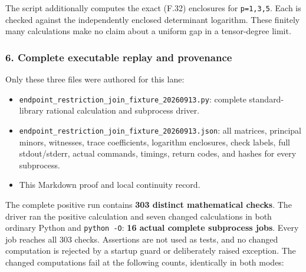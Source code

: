The script additionally computes the exact (F.32) enclosures for \nolinkurl{p=1,3,5}. Each is checked against the independently enclosed determinant logarithm. These finitely many calculations make no claim about a uniform gap in a tensor-degree limit.

\subsubsection{6. Complete executable replay and provenance}\label{endpoint-restriction_fixture--complete-executable-replay-and-provenance}

Only these three files were authored for this lane:

\begin{itemize}
\tightlist
\item
  \nolinkurl{endpoint_restriction_join_fixture_20260913.py}: complete standard-library rational calculation and subprocess driver.
\item
  \nolinkurl{endpoint_restriction_join_fixture_20260913.json}: all matrices, principal minors, witnesses, trace coefficients, logarithm enclosures, check labels, full stdout/stderr, actual commands, timings, return codes, and hashes for every subprocess.
\item
  This Markdown proof and local continuity record.
\end{itemize}

The complete positive run contains \textbf{303 distinct mathematical checks}. The driver ran the positive calculation and seven changed calculations in both ordinary Python and \texttt{python\ -O}: \textbf{16 actual complete subprocess jobs}. Every job reaches all 303 checks. Assertions are not used as tests, and no changed computation is rejected by a startup guard or deliberately raised exception. The changed computations fail at the following counts, identically in both modes:

